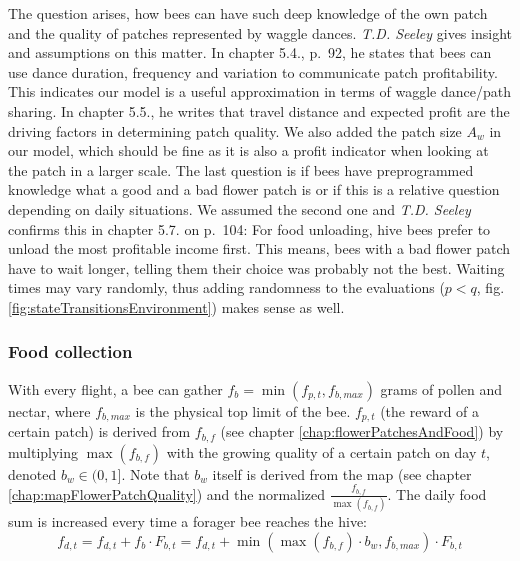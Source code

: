 			The question arises, how bees can have such deep knowledge of the own patch and the quality of patches represented by waggle dances. \textit{T.D. Seeley} \cite{seeley95} gives insight and assumptions on this matter. In chapter 5.4., p.~92, he states that bees can use dance duration, frequency and variation to communicate patch profitability. This indicates our model is a useful approximation in terms of waggle dance/path sharing. In chapter 5.5., he writes that travel distance and expected profit are the driving factors in determining patch quality. We also added the patch size $A_w$ in our model, which should be fine as it is also a profit indicator when looking at the patch in a larger scale. The last question is if bees have preprogrammed knowledge what a good and a bad flower patch is or if this is a relative question depending on daily situations. We assumed the second one and \textit{T.D. Seeley} confirms this in chapter 5.7. on p.~104: For food unloading, hive bees prefer to unload the most profitable income first. This means, bees with a bad flower patch have to wait longer, telling them their choice was probably not the best. Waiting times may vary randomly, thus adding randomness to the evaluations ($p < q$, fig. \ref{fig:stateTransitionsEnvironment}) makes sense as well.
	
		\subsubsection{Food collection}
			\label{chap:foodCollection}
			With every flight, a bee can gather $f_b = \min(f_{p,t},f_{b,max})$ grams of pollen and nectar, where $f_{b,max}$ is the physical top limit of the bee. $f_{p,t}$ (the reward of a certain patch) is derived from $f_{b,f}$ (see chapter \ref{chap:flowerPatchesAndFood}) by multiplying $\max(f_{b,f})$ with the growing quality of a certain patch on day $t$, denoted $b_w \in (0,1]$. Note that $b_w$ itself is derived from the map (see chapter \ref{chap:mapFlowerPatchQuality}) and the normalized $\frac{f_{b,f}}{\max(f_{b,f})}$. The daily food sum is increased every time a forager bee reaches the hive:			
			\begin{equation}\label{eq:foodChangeDailyComputation}
				f_{d,t} = f_{d,t} + f_b \cdot F_{b,t} = f_{d,t} + \min(\max(f_{b,f}) \cdot b_w,f_{b,max}) \cdot F_{b,t}
			\end{equation}
			
